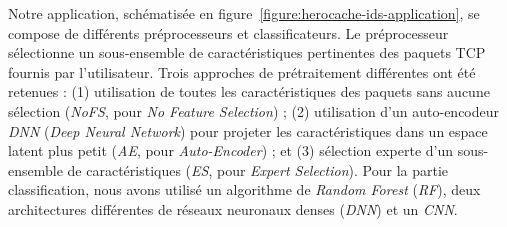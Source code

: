 Notre application, schématisée en figure~\ref{figure:herocache-ids-application}, se compose de différents préprocesseurs et classificateurs. Le préprocesseur sélectionne un sous-ensemble de caractéristiques pertinentes des paquets \gls{TCP} fournis par l'utilisateur. Trois approches de prétraitement différentes ont été retenues : (1) utilisation de toutes les caractéristiques des paquets sans aucune sélection (\textit{NoFS}, pour \textit{No Feature Selection}) ; (2) utilisation d'un auto-encodeur \textit{DNN} (\textit{Deep Neural Network}) pour projeter les caractéristiques dans un espace latent plus petit (\textit{AE}, pour \textit{Auto-Encoder}) ; et (3) sélection experte d'un sous-ensemble de caractéristiques (\textit{ES}, pour \textit{Expert Selection}). Pour la partie classification, nous avons utilisé un algorithme de \textit{Random Forest} (\textit{RF}), deux architectures différentes de réseaux neuronaux denses (\textit{DNN}) et un \textit{CNN}.

